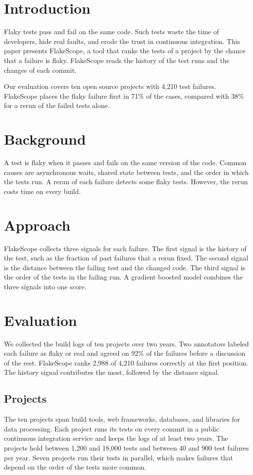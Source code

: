 \section{Introduction}
Flaky tests pass and fail on the same code. Such tests waste the time of developers, hide real faults, and erode the
trust in continuous integration. This paper presents FlakeScope, a tool that ranks the tests of a project by the
chance that a failure is flaky. FlakeScope reads the history of the test runs and the changes of each commit.

Our evaluation covers ten open source projects with 4,210 test failures. FlakeScope places the flaky failure first
in 71\% of the cases, compared with 38\% for a rerun of the failed tests alone.

\section{Background}
A test is flaky when it passes and fails on the same version of the code. Common causes are asynchronous waits,
shared state between tests, and the order in which the tests run. A rerun of each failure detects some flaky
tests. However, the rerun costs time on every build.

\section{Approach}
FlakeScope collects three signals for each failure. The first signal is the history of the test, such as the
fraction of past failures that a rerun fixed. The second signal is the distance between the failing test and the changed
code. The third signal is the order of the tests in the failing run. A gradient boosted model combines the three
signals into one score.

\section{Evaluation}
We collected the build logs of ten projects over two years. Two annotators labeled each failure as flaky or real
and agreed on 92\% of the failures before a discussion of the rest. FlakeScope ranks 2,988 of 4,210 failures
correctly at the first position. The history signal contributes the most, followed by the distance signal.

\subsection{Projects}
The ten projects span build tools, web frameworks, databases, and libraries for data processing. Each project
runs its tests on every commit in a public continuous integration service and keeps the logs of at least two
years. The projects hold between 1,200 and 18,000 tests and between 40 and 900 test failures per year. Seven
projects run their tests in parallel, which makes failures that depend on the order of the tests more common.

